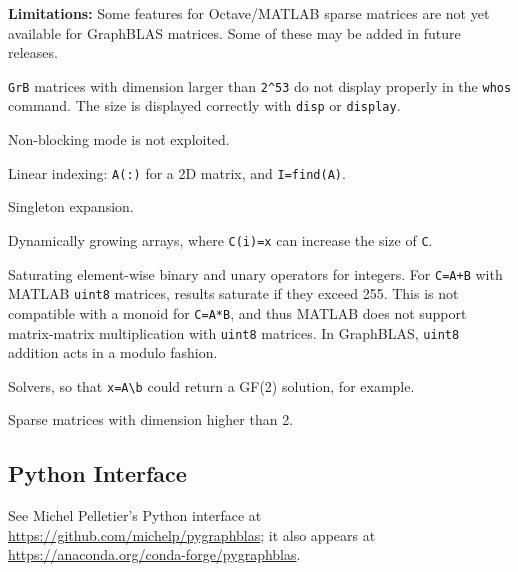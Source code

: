 \documentclass[12pt]{article}
\newenvironment{packed_itemize}{
\begin{itemize}
  \setlength{\itemsep}{1pt}
  \setlength{\parskip}{0pt}
  \setlength{\parsep}{0pt}
}{\end{itemize}}
\begin{document}
{\bf Limitations:}
Some features for Octave/MATLAB sparse matrices are not yet available for
GraphBLAS matrices.  Some of these may be added in future releases.

\begin{packed_itemize}
    \item \verb'GrB' matrices with dimension larger than \verb'2^53' do not
        display properly in the \verb'whos' command.  The size is displayed
        correctly with \verb'disp' or \verb'display'.
    \item Non-blocking mode is not exploited.
    \item Linear indexing: \verb'A(:)' for a 2D matrix, and \verb'I=find(A)'.
    \item Singleton expansion.
    \item Dynamically growing arrays, where \verb'C(i)=x' can increase
        the size of \verb'C'.
    \item Saturating element-wise binary and unary operators for integers.
        For \verb'C=A+B' with MATLAB \verb'uint8' matrices, results
        saturate if they exceed 255.  This is not compatible with
        a monoid for \verb'C=A*B', and thus MATLAB does not support
        matrix-matrix multiplication with \verb'uint8' matrices.
        In GraphBLAS, \verb'uint8' addition acts in a modulo fashion.
    \item Solvers, so that \verb'x=A\b' could return a GF(2) solution,
        for example.
    \item Sparse matrices with dimension higher than 2.
\end{packed_itemize}

\subsection{Python Interface}
\label{python}

See Michel Pelletier's Python interface at
\url{https://github.com/michelp/pygraphblas};
it also appears at
\url{https://anaconda.org/conda-forge/pygraphblas}.
\end{document}
